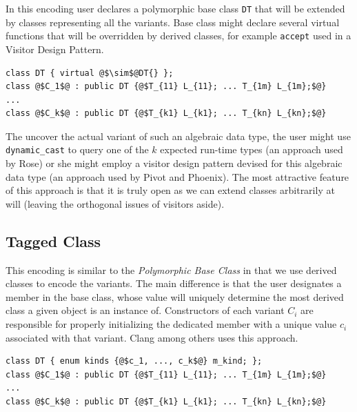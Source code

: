 \documentclass[preprint]{sigplanconf}
\makeatletter
\DeclareRobustCommand{\code}[1]{{\lstinline[breaklines=false,escapechar=@]{#1}}}
\makeatother
\begin{document}
In this encoding user declares a polymorphic base class \code{DT} that will 
be extended by classes representing all the variants. Base class might declare 
several virtual functions that will be overridden by derived classes, for example 
\code{accept} used in a Visitor Design Pattern.

\begin{lstlisting}[keepspaces,columns=flexible]
class DT { virtual @$\sim$@DT{} };
class @$C_1$@ : public DT {@$T_{11} L_{11}; ... T_{1m} L_{1m};$@} 
...
class @$C_k$@ : public DT {@$T_{k1} L_{k1}; ... T_{kn} L_{kn};$@} 
\end{lstlisting}

The uncover the actual variant of such an algebraic data type, the user might 
use \code{dynamic_cast} to query one of the $k$ expected run-time types (an 
approach used by Rose\cite{SQ03}) or she might employ a visitor design pattern 
devised for this algebraic data type (an approach used by Pivot\cite{Pivot09} 
and Phoenix\cite{Phoenix}). The most attractive feature of this approach is that 
it is truly open as we can extend classes arbitrarily at will (leaving the 
orthogonal issues of visitors aside).

\subsection{Tagged Class}
\label{sec:tc}

This encoding is similar to the \emph{Polymorphic Base Class} in that we use 
derived classes to encode the variants. The main difference is that the user 
designates a member in the base class, whose value will uniquely 
determine the most derived class a given object is an instance of. Constructors 
of each variant $C_i$ are responsible for properly initializing the dedicated 
member with a unique value $c_i$ associated with that variant. Clang\cite{Clang} 
among others uses this approach.

\begin{lstlisting}[keepspaces,columns=flexible]
class DT { enum kinds {@$c_1, ..., c_k$@} m_kind; };
class @$C_1$@ : public DT {@$T_{11} L_{11}; ... T_{1m} L_{1m};$@} 
...
class @$C_k$@ : public DT {@$T_{k1} L_{k1}; ... T_{kn} L_{kn};$@} 
\end{lstlisting}
\end{document}
